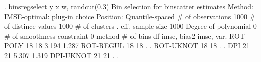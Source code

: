 . binsregselect y x w, randcut(0.3)
{\smallskip}
{\smallskip}
Bin selection for binscatter estimates
Method: IMSE-optimal: plug-in choice
Position: Quantile-spaced
{\smallskip}
          \# of observations {\VBAR}    1000
       \# of distince values {\VBAR}    1000
              \# of clusters {\VBAR}       .
           eff. sample size {\VBAR}    1000
       Degree of polynomial {\VBAR}       0
 \# of smoothness constraint {\VBAR}       0
{\smallskip}
    method    {\VBAR}  \# of bins {\VBAR}     df   {\VBAR} imse, bias{\caret}2 {\VBAR}  imse, var.  
   ROT-POLY   {\VBAR}      18    {\VBAR}     18   {\VBAR}    3.194     {\VBAR}    1.287
   ROT-REGUL  {\VBAR}      18    {\VBAR}     18   {\VBAR}        .     {\VBAR}        .
   ROT-UKNOT  {\VBAR}      18    {\VBAR}     18   {\VBAR}        .     {\VBAR}        .
      DPI     {\VBAR}      21    {\VBAR}     21   {\VBAR}    5.307     {\VBAR}    1.319
   DPI-UKNOT  {\VBAR}      21    {\VBAR}     21   {\VBAR}        .     {\VBAR}        .
